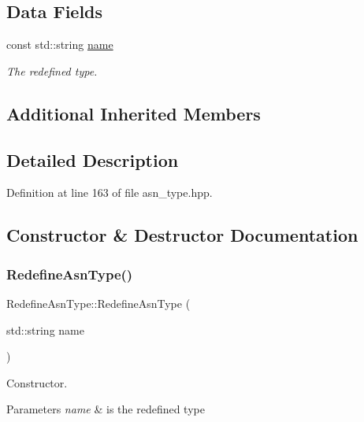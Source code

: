 \subsection*{Data Fields}
\begin{DoxyCompactItemize}
\item 
const std\+::string \hyperlink{classRedefineAsnType_abae8c5126b4432047963eb62d265ce6d}{name}
\begin{DoxyCompactList}\small\item\em The redefined type. \end{DoxyCompactList}\end{DoxyCompactItemize}
\subsection*{Additional Inherited Members}


\subsection{Detailed Description}


Definition at line 163 of file asn\+\_\+type.\+hpp.



\subsection{Constructor \& Destructor Documentation}
\mbox{\label{classRedefineAsnType_a9b565e47e6bb941c50820361ff2c6a1a}} 
\subsubsection{\texorpdfstring{Redefine\+Asn\+Type()}{RedefineAsnType()}}
{\footnotesize\ttfamily Redefine\+Asn\+Type\+::\+Redefine\+Asn\+Type (\begin{DoxyParamCaption}\item[{std\+::string}]{name }\end{DoxyParamCaption})\hspace{0.3cm}{\ttfamily [explicit]}}



Constructor. 


\begin{DoxyParams}{Parameters}
{\em name} & is the redefined type \\
\hline
\end{DoxyParams}


